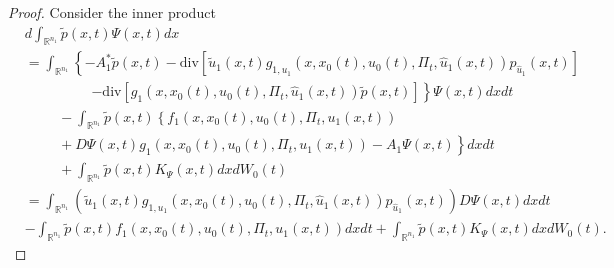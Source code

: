 \documentclass[12pt]{article}
\theoremstyle{definition}
\begin{document}
\begin{proof}
Consider the inner product
    \begin{align*}
        & d\int_{\mathbb{R}^{n_1}}\tilde{p}(x,t)\Psi(x,t)dx \\
        &= \int_{\mathbb{R}^{n_1}} \left\{-A_1^*\tilde{p}(x,t)-\mathrm{div}\left[\tilde{u}_1(x,t)g_{1,u_1}(x,x_0(t),u_0(t),\Pi_t,\hat{u}_1(x,t))p_{\hat{u}_1}(x,t)\right]\right.\\
        &\hspace{2cm} \left. -\mathrm{div}\left[g_1(x,x_0(t),u_0(t),\Pi_t,\hat{u}_1(x,t))\tilde{p}(x,t)\right] \right\}\Psi(x,t)dxdt\\
        &\hspace{1cm} -\int_{\mathbb{R}^{n_1}} \tilde{p}(x,t)\left\{ f_1(x, x_0(t), u_0(t), \Pi_t, u_1(x,t)) \right.\\
        &\hspace{1cm}+\left. D\Psi(x,t)g_1(x,x_0(t),u_0(t),\Pi_t,u_1(x,t)) - A_1 \Psi(x,t) \right\} dxdt \\
        &\hspace{1cm} + \int_{\mathbb{R}^{n_1}} \tilde{p}(x,t)K_\Psi(x,t) dxdW_0(t)\\
        &=\int_{\mathbb{R}^{n_1}} \left( \tilde{u}_1(x,t)g_{1,u_1}(x,x_0(t),u_0(t),\Pi_t,\hat{u}_1(x,t))p_{\hat{u}_1}(x,t) \right)D\Psi(x,t)dxdt\\
        & -\int_{\mathbb{R}^{n_1}}\tilde{p}(x,t) f_1(x, x_0(t), u_0(t), \Pi_t, u_1(x,t)) dxdt+ \int_{\mathbb{R}^{n_1}} \tilde{p}(x,t)K_\Psi(x,t) dxdW_0(t).
    \end{align*}


\end{proof}
\end{document}

